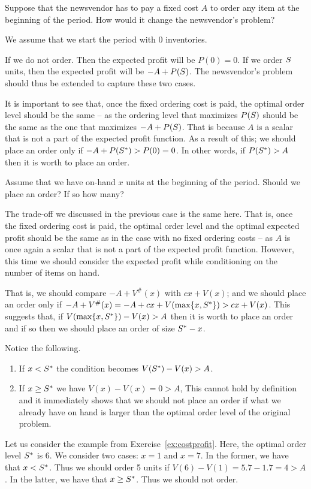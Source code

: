 \begin{exercise}
Suppose that the newsvendor has to pay a fixed cost $A$ to order any item at the beginning of the period. How would it change the newsvendor's problem?


\begin{solution}
We assume that we start the period with 0 inventories. 

If we do not order. Then the expected profit will be $P(0)=0$. If we order $S$ units, then the expected profit will be $-A+P(S)$. The newsvendor's problem should thus be extended to capture these two cases. 

It is important to see that, once the fixed ordering cost is paid, the optimal order level should be the same -- as the ordering level that maximizes $P(S)$ should be the same as the one that maximizes $-A+P(S)$. That is because $A$ is a scalar that is not a part of the expected profit function. As a result of this; we should place an order only if $-A+P(S^*)>P(0)=0$. In other words, if $P(S^*)>A$ then it is worth to place an order. 
\end{solution}
\end{exercise}

\begin{exercise}
Assume that we have on-hand $x$ units at the beginning of the period. Should we place an order? If so how many?


\begin{solution}
The trade-off we discussed in the previous case is the same here. That is, once the fixed ordering cost is paid, the optimal order level and the optimal expected profit should be the same as in the case with no fixed ordering costs -- as $A$ is once again a scalar that is not a part of the expected profit function. However, this time we should consider the expected profit while conditioning on the number of items on hand. 

That is, we should compare $-A+V^\#(x)$ with $cx+V(x)$; and we should place an order only if $-A+V^\#(x)=-A+cx+V(\max\{x,S^*\})>cx+V(x)$. This suggests that, if $V(\max\{x,S^*\})-V(x)>A$ then it is worth to place an order and if so then we should place an order of size $S^*-x$.

Notice the following.
\begin{enumerate}
\item If $x<S^*$ the condition becomes $V(S^*)-V(x)>A$.
\item If $x\geq S^*$ we have $V(x)-V(x)=0>A$, This cannot hold by definition and it immediately shows that we should not place an order if what we already have on hand is larger than the optimal order level of the original problem.
\end{enumerate}

Let us consider the example from Exercise~\ref{ex:costprofit}. Here, the optimal order level $S^*$ is 6. We consider two cases: $x=1$ and $x=7$. In the former, we have that $x<S^*$. Thus we should order 5 units if $V(6)-V(1)=5.7-1.7=4>A$. In the latter, we have that $x\geq S^*$. Thus we should not order.
\end{solution}
\end{exercise}


